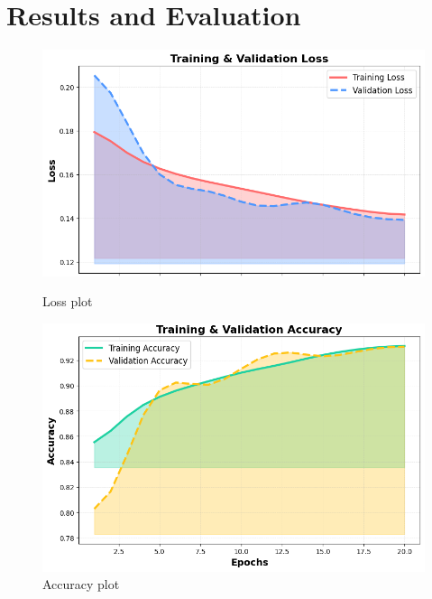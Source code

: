 \section{Results and Evaluation}

\begin{figure}[htbp]
	\centering
	\begin{minipage}[b]{0.45\linewidth}
		\includegraphics[width=\linewidth]{img/paper_3/loss plot}
		\caption{Loss plot}
		\label{fig:loss-plot}
	\end{minipage}
	\hfill
	\begin{minipage}[b]{0.45\linewidth}
		\includegraphics[width=\linewidth]{img/paper_3/accuracy plot}
		\caption{Accuracy plot}
		\label{fig:accuracy-plot}
	\end{minipage}
\end{figure}

